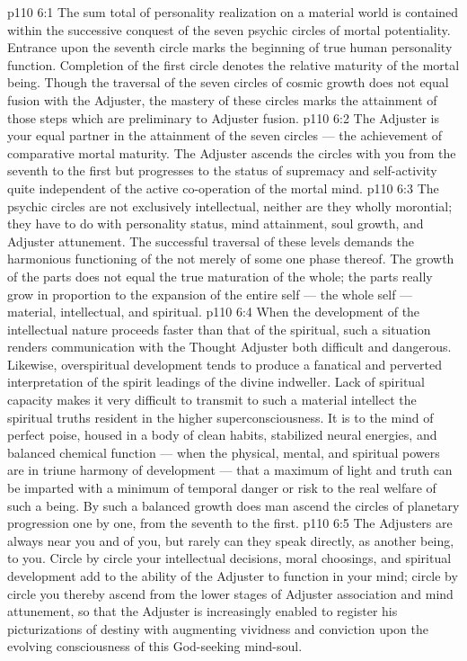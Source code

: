 \vs p110 6:1 The sum total of personality realization on a material world is contained within the successive conquest of the seven psychic circles of mortal potentiality. Entrance upon the seventh circle marks the beginning of true human personality function. Completion of the first circle denotes the relative maturity of the mortal being. Though the traversal of the seven circles of cosmic growth does not equal fusion with the Adjuster, the mastery of these circles marks the attainment of those steps which are preliminary to Adjuster fusion.
\vs p110 6:2 The Adjuster is your equal partner in the attainment of the seven circles --- the achievement of comparative mortal maturity. The Adjuster ascends the circles with you from the seventh to the first but progresses to the status of supremacy and self\hyp{}activity quite independent of the active co\hyp{}operation of the mortal mind.
\vs p110 6:3 \pc The psychic circles are not exclusively intellectual, neither are they wholly morontial; they have to do with personality status, mind attainment, soul growth, and Adjuster attunement. The successful traversal of these levels demands the harmonious functioning of the  not merely of some one phase thereof. The growth of the parts does not equal the true maturation of the whole; the parts really grow in proportion to the expansion of the entire self --- the whole self --- material, intellectual, and spiritual.
\vs p110 6:4 When the development of the intellectual nature proceeds faster than that of the spiritual, such a situation renders communication with the Thought Adjuster both difficult and dangerous. Likewise, overspiritual development tends to produce a fanatical and perverted interpretation of the spirit leadings of the divine indweller. Lack of spiritual capacity makes it very difficult to transmit to such a material intellect the spiritual truths resident in the higher superconsciousness. It is to the mind of perfect poise, housed in a body of clean habits, stabilized neural energies, and balanced chemical function --- when the physical, mental, and spiritual powers are in triune harmony of development --- that a maximum of light and truth can be imparted with a minimum of temporal danger or risk to the real welfare of such a being. By such a balanced growth does man ascend the circles of planetary progression one by one, from the seventh to the first.
\vs p110 6:5 \pc The Adjusters are always near you and of you, but rarely can they speak directly, as another being, to you. Circle by circle your intellectual decisions, moral choosings, and spiritual development add to the ability of the Adjuster to function in your mind; circle by circle you thereby ascend from the lower stages of Adjuster association and mind attunement, so that the Adjuster is increasingly enabled to register his picturizations of destiny with augmenting vividness and conviction upon the evolving consciousness of this God\hyp{}seeking mind\hyp{}soul.
